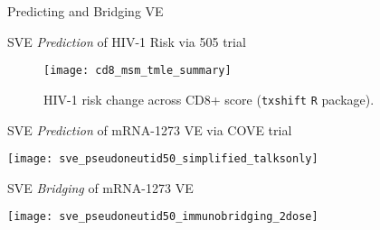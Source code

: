\documentclass{beamer}
\begin{document}

\begin{frame}[standout]
  Predicting and Bridging VE
\end{frame}


\begin{frame}[c]{SVE \textit{Prediction} of HIV-1 Risk via 505 trial}

\vspace{-0.3in}
\begin{figure}[H]
  \centering
  \texttt{[image: cd8\_msm\_tmle\_summary]}
  \captionsetup{labelformat=empty}
  \vspace{-1.5em}
  \caption{
    HIV-1 risk change across CD8+ score (\texttt{txshift} \texttt{R}
    package).
  }
\end{figure}

\note{
}

\end{frame}


\begin{frame}[c]{SVE \textit{Prediction} of mRNA-1273 VE via COVE trial}

\vspace*{-0.1cm}
\hspace*{-0.3cm}\texttt{[image: sve\_pseudoneutid50\_simplified\_talksonly]}

\note{
}

\end{frame}







\begin{frame}[c]{SVE \textit{Bridging} of mRNA-1273 VE~\citep{hejazi2023stochastic}}

\vspace*{-0.1cm}
\hspace*{-0.3cm}\texttt{[image: sve\_pseudoneutid50\_immunobridging\_2dose]}


\end{frame}
\end{document}
